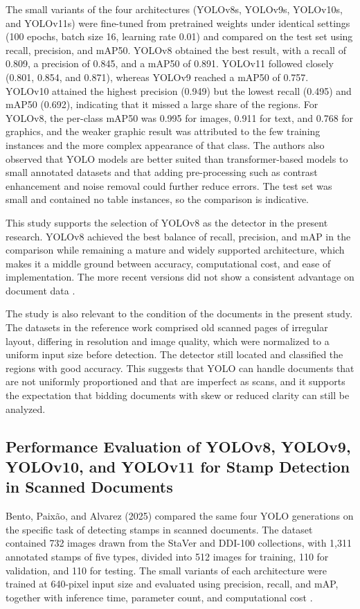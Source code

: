 The small variants of the four architectures (YOLOv8s, YOLOv9s, YOLOv10s, and YOLOv11s) were fine-tuned from pretrained weights under identical settings (100 epochs, batch size 16, learning rate 0.01) and compared on the test set using recall, precision, and mAP50.
YOLOv8 obtained the best result, with a recall of 0.809, a precision of 0.845, and a mAP50 of 0.891.
YOLOv11 followed closely (0.801, 0.854, and 0.871), whereas YOLOv9 reached a mAP50 of 0.757.
YOLOv10 attained the highest precision (0.949) but the lowest recall (0.495) and mAP50 (0.692), indicating that it missed a large share of the regions.
For YOLOv8, the per-class mAP50 was 0.995 for images, 0.911 for text, and 0.768 for graphics, and the weaker graphic result was attributed to the few training instances and the more complex appearance of that class.
The authors also observed that YOLO models are better suited than transformer-based models to small annotated datasets and that adding pre-processing such as contrast enhancement and noise removal could further reduce errors.
The test set was small and contained no table instances, so the comparison is indicative.

This study supports the selection of YOLOv8 as the detector in the present research.
YOLOv8 achieved the best balance of recall, precision, and mAP in the comparison while remaining a mature and widely supported architecture, which makes it a middle ground between accuracy, computational cost, and ease of implementation.
The more recent versions did not show a consistent advantage on document data \cite{ref48}.

The study is also relevant to the condition of the documents in the present study.
The datasets in the reference work comprised old scanned pages of irregular layout, differing in resolution and image quality, which were normalized to a uniform input size before detection.
The detector still located and classified the regions with good accuracy.
This suggests that YOLO can handle documents that are not uniformly proportioned and that are imperfect as scans, and it supports the expectation that bidding documents with skew or reduced clarity can still be analyzed.

\subsection{Performance Evaluation of YOLOv8, YOLOv9, YOLOv10, and YOLOv11 for Stamp Detection in Scanned Documents}

Bento, Paixão, and Alvarez (2025) compared the same four YOLO generations on the specific task of detecting stamps in scanned documents.
The dataset contained 732 images drawn from the StaVer and DDI-100 collections, with 1,311 annotated stamps of five types, divided into 512 images for training, 110 for validation, and 110 for testing.
The small variants of each architecture were trained at 640-pixel input size and evaluated using precision, recall, and mAP, together with inference time, parameter count, and computational cost \cite{ref49}.

